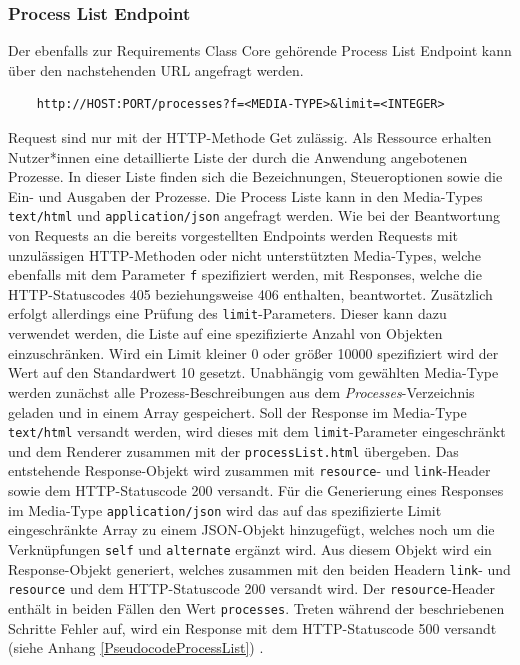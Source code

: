 \subsubsection{Process List Endpoint}
Der ebenfalls zur Requirements Class Core gehörende Process List Endpoint kann über den nachstehenden URL 
angefragt werden. 
\begin{center}
\begin{BVerbatim}
    http://HOST:PORT/processes?f=<MEDIA-TYPE>&limit=<INTEGER>
\end{BVerbatim}
\end{center}
Request sind nur mit der HTTP-Methode Get zulässig. Als Ressource erhalten Nutzer*innen eine detaillierte Liste der durch die Anwendung angebotenen 
Prozesse. In dieser Liste finden sich die Bezeichnungen, 
Steueroptionen sowie die Ein- und Ausgaben der Prozesse. Die Process Liste kann in den Media-Types \verb|text/html| 
und \verb|application/json| angefragt werden. 
Wie bei der Beantwortung von Requests an die bereits vorgestellten Endpoints werden Requests mit unzulässigen HTTP-Methoden oder nicht unterstützten Media-Types,
welche ebenfalls mit dem Parameter \verb|f| spezifiziert werden, 
mit Responses, welche die HTTP-Statuscodes 405 beziehungsweise 406 enthalten, beantwortet.  
Zusätzlich erfolgt allerdings eine Prüfung des \verb|limit|-Parameters. Dieser kann dazu verwendet werden, die Liste auf eine spezifizierte Anzahl von 
Objekten einzuschränken. Wird ein Limit kleiner 0 oder größer 10000 spezifiziert wird der Wert auf den Standardwert 10 gesetzt. 
Unabhängig vom gewählten Media-Type werden zunächst alle Prozess-Beschreibungen aus dem \emph{Processes}-Verzeichnis geladen und in einem 
Array gespeichert. Soll der Response im Media-Type \verb|text/html| versandt werden, wird dieses mit dem \verb|limit|-Parameter eingeschränkt und dem Renderer 
zusammen mit der \verb|processList.html| übergeben. Das entstehende Response-Objekt wird zusammen mit \verb|resource|- und \verb|link|-Header sowie dem 
HTTP-Statuscode 200 versandt. Für die Generierung eines Responses im Media-Type \verb|application/json| wird das auf das spezifizierte Limit eingeschränkte 
Array zu einem JSON-Objekt hinzugefügt, welches noch um die Verknüpfungen \verb|self| und \verb|alternate| ergänzt wird. Aus diesem Objekt wird ein 
Response-Objekt generiert, welches zusammen mit den beiden Headern \verb|link|- und \verb|resource| und dem HTTP-Statuscode 200 versandt wird. 
Der \verb|resource|-Header enthält in beiden Fällen den Wert \verb|processes|. 
Treten während der beschriebenen Schritte Fehler auf, wird ein Response mit dem HTTP-Statuscode 500 versandt (siehe Anhang \ref{PseudocodeProcessList}) 
\cite{code,ogc_api_processes_core}.

